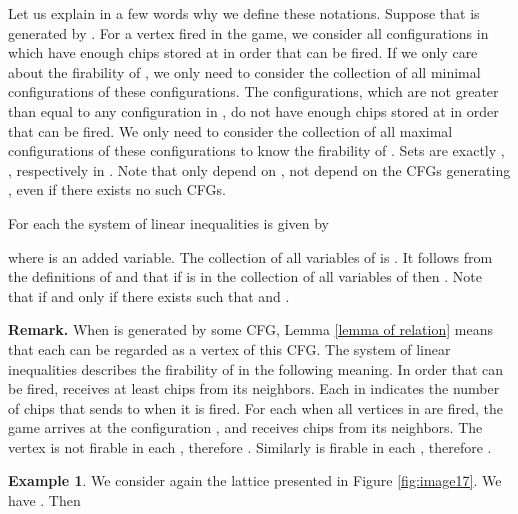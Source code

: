 \documentclass{article}
\theoremstyle{definition}
\newtheorem{examp}{Example}
\begin{document}
Let us explain in a few words why we define these notations. Suppose that  is generated by . For a vertex  fired in the game, we consider all configurations in  which have enough chips stored at  in order that  can be fired. If we only care about the firability of , we only need to consider the collection  of all  minimal configurations of these configurations. The configurations, which are not greater than equal to any configuration in , do not have enough chips stored at  in order that  can be fired. We only need to consider the collection  of all maximal configurations of these configurations to know the firability of . Sets  are exactly , , respectively in . Note that  only depend on , not depend on the CFGs generating , even if there exists no such CFGs. 

For each  the system of linear inequalities  is given by

where  is an added variable. The collection of all variables of  is . It follows from the definitions of  and  that if  is in the collection of all variables of  then . Note that  if and only if there exists  such that  and .

\textbf{Remark.} When  is generated by some CFG, Lemma \ref{lemma of relation} means that each  can be regarded as a vertex of this CFG. The system of linear inequalities  describes the firability of  in the following meaning. In order that  can be fired,  receives at least  chips from its neighbors. Each  in  indicates the number of chips that  sends to  when it is fired. For each  when all vertices in  are fired, the game arrives at the configuration , and  receives  chips from its neighbors. The vertex  is not firable in each , therefore . Similarly  is firable in each , therefore . 
\begin{examp}
\label{first example}
We consider again the lattice presented in Figure \ref{fig:image17}.  We have  . Then 


\end{examp}
\end{document}
